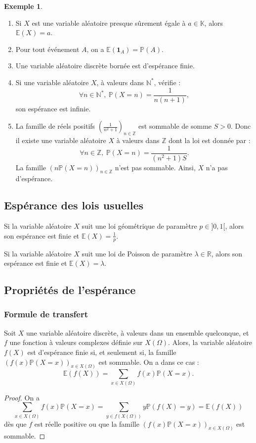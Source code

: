 \documentclass[french]{article}
\renewcommand{\P}{\mathbb{P}}
\newcommand{\N}{\mathbb{N}}
\newcommand{\Z}{\mathbb{Z}}
\newcommand{\R}{\mathbb{R}}
\newcommand{\K}{\mathbb{K}}
\newcommand{\st}{^*}
\newcommand{\E}{\mathbb{E}}
\theoremstyle{plain}
\theoremstyle{definition}
\newtheorem*{ex}{Exemple}
\theoremstyle{remark}
\begin{document}
\begin{ex}
	\begin{enumerate}
		\item Si $X$ est une variable aléatoire presque sûrement égale à $a\in\K$, alors $\E(X)=a$.
		\item Pour tout événement $A$, on a $\E(\textbf{1}_A)=\P(A)$.
		\item Une variable aléatoire discrète bornée est d'espérance finie.
		\item Si une variable aléatoire $X$, à valeurs dans $\N\st$, vérifie : $$\forall n\in\N\st,\ \P(X=n)=\frac{1}{n(n+1)},$$ son espérance est infinie.
		\item La famille de réels positifs $\displaystyle\left(\frac{1}{n^2+1}\right)_{n\in\Z}$ est sommable de somme $S>0$. Donc il existe une variable aléatoire $X$ à valeurs dans $\Z$ dont la loi est donnée par :
		$$\forall n\in\Z,\ \P(X=n)=\frac{1}{(n^2+1)S}.$$ La famille $(n\P(X=n))_{n\in\Z}$ n'est pas sommable. Ainsi, $X$ n'a pas d'espérance.
	\end{enumerate}
\end{ex}

\subsection{Espérance des lois usuelles}

\begin{prop}%
	Si la variable aléatoire $X$ suit une loi géométrique de paramètre $p\in]0,1[$, alors son espérance est finie et $\E(X)=\displaystyle\frac{1}{p}$.
\end{prop}

\begin{prop}%
	Si la variable aléatoire $X$ suit une loi de Poisson de paramètre $\lambda\in\R$, alors son espérance est finie et $\E(X)=\lambda$.
\end{prop}

\subsection{Propriétés de l'espérance}

\subsubsection*{Formule de transfert}

\begin{thm}%
	Soit $X$ une variable aléatoire discrète, à valeurs dans un ensemble quelconque, et $f$ une fonction à valeurs complexes définie sur $X(\Omega)$. Alors, la variable aléatoire $f(X)$ est d'espérance finie si, et seulement si, la famille $(f(x)\P(X=x))_{x\in X(\Omega)}$ est sommable. On a dans ce cas :
	$$\E(f(X))=\sum_{x\in X(\Omega)}f(x)\P(X=x).$$
\end{thm}
\begin{proof}
	On a
	$$\sum_{x\in X(\Omega)}f(x)\P(X=x)=\sum_{y\in f(X(\Omega))}y\P(f(X)=y)=\E(f(X))$$ dès que $f$ est réelle positive ou que la famille $(f(x)\P(X=x))_{x\in X(\Omega)}$ est sommable.
\end{proof}
\end{document}
